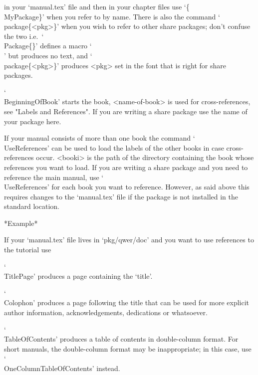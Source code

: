 
in  your  `manual.tex'  file  and  then  in  your   chapter   files   use
`\{\\MyPackage\}' when you refer to  by name. There is
also the command `\\package\{<pkg>\}' when you wish  to  refer  to  other
share        packages;        don't        confuse        the         two
i.e.~`\\Package\{<share-package-name>\}'      defines       a       macro
`\\<share-package-name>' but produces no text,  and  `\\package\{<pkg>\}'
produces <pkg> set in the font that is right for share packages.

`\\BeginningOfBook' starts   the   book, <name-of-book>   is  used    for
cross-references,  see "Labels  and References".   If  you are  writing a
share package use the name of your package here.

If   your manual   consists   of more    than    one book  the    command
`\\UseReferences' can  be used to  load the labels  of the other books in
case  cross-references  occur.  <booki>  is  the  path  of the  directory
containing  the book  whose  references you want  to   load.  If you  are
writing a share package and you need to reference the main {\GAP} manual,
use  `\\UseReferences' for each book  you want to reference.  However, as
said above this requires changes to the `manual.tex' file if the  package
is not installed in the standard location.

*Example*

If your `manual.tex' file lives in `pkg/qwer/doc' and  you  want  to  use
references to the tutorial use

\begintt
{}
\endtt

`\\TitlePage' produces a page containing the `title'.

`\\Colophon' produces a page following the title that  can  be  used  for
more  explicit  author  information,  acknowledgements,  dedications   or
whatsoever.

`\\TableOfContents' produces a table of contents in double-column format.
For short manuals, the double-column format may be inappropriate; in this
case, use `\\OneColumnTableOfContents' instead.

